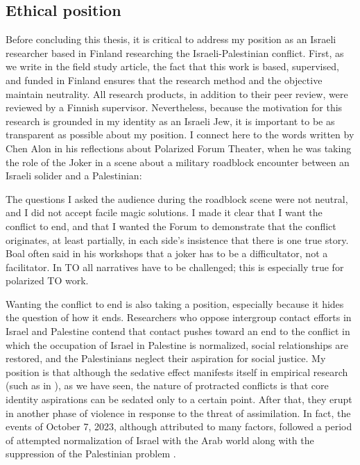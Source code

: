 \documentclass[dissertation,math,vertlayout,pdfa,colorlinks]{aaltoseries}
\begin{document}
\subsection{Ethical position}
Before concluding this thesis, it is critical to address my position as an Israeli researcher based in Finland researching the Israeli-Palestinian conflict. First, as we write in the field study article, the fact that this work is based, supervised, and funded in Finland ensures that the research method and the objective maintain neutrality. All research products, in addition to their peer review, were reviewed by a Finnish supervisor. Nevertheless, because the motivation for this research is grounded in my identity as an Israeli Jew, it is important to be as transparent as possible about my position. I connect here to the words written by Chen Alon in his reflections about Polarized Forum Theater, when he was taking the role of the Joker in a scene about a military roadblock encounter between an Israeli solider and a Palestinian:
\begin{displayquote}
The questions I asked the audience during the roadblock scene were not neutral, and I did not accept facile magic solutions. I made it clear that I want the conflict to end, and that I wanted the Forum to demonstrate that the conflict originates, at least partially, in each side's insistence that there is one true story. Boal often said in his workshops that a joker has to be a difficultator, not a facilitator. In TO all narratives have to be challenged; this is especially true for polarized TO work.
\end{displayquote}
Wanting the conflict to end is also taking a position, especially because it hides the question of how it ends. Researchers who oppose intergroup contact efforts in Israel and Palestine contend that contact pushes toward an end to the conflict in which the occupation of Israel in Palestine is normalized, social relationships are restored, and the Palestinians neglect their aspiration for social justice. My position is that although the sedative effect manifests itself in empirical research (such as in \cite{albzourTalkingSegregationWall2022}), as we have seen, the nature of protracted conflicts is that core identity aspirations can be sedated only to a certain point. After that, they erupt in another phase of violence in response to the threat of assimilation. In fact, the events of October 7, 2023, although attributed to many factors, followed a period of attempted normalization of Israel with the Arab world along with the suppression of the Palestinian problem \cite{fraihatUnderstandingOctober7th2024}. 
\end{document}
